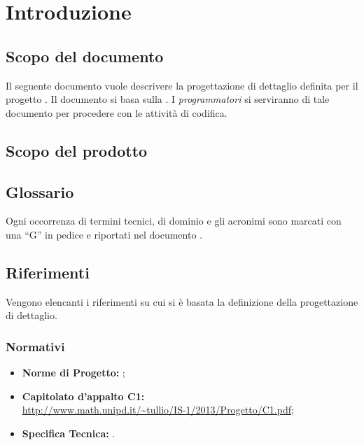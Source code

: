 \section{Introduzione}


\subsection{Scopo del documento}
Il seguente documento vuole descrivere la progettazione di dettaglio definita per il progetto \ProjectName{}. Il documento si basa sulla \SpecificaTecnica{}. I \textit{programmatori} si serviranno di tale documento per procedere con le attività di codifica.

\subsection{Scopo del prodotto}
\ScopoDelProdotto 

\subsection{Glossario}
Ogni occorrenza di termini tecnici, di dominio e gli acronimi sono marcati con una ``G'' in pedice e riportati nel documento \Glossario{}.

\subsection{Riferimenti}
Vengono elencanti i riferimenti su cui si è basata la definizione della progettazione di dettaglio.
	\subsubsection{Normativi}
		\begin{itemize}
  			\item \textbf{Norme di Progetto:}  \NormeDiProgetto;
			\item \textbf{Capitolato d'appalto C1:} \\ \url{http://www.math.unipd.it/~tullio/IS-1/2013/Progetto/C1.pdf};
			\item \textbf{Specifica Tecnica:} \SpecificaTecnica{}.
		\end{itemize}
	


